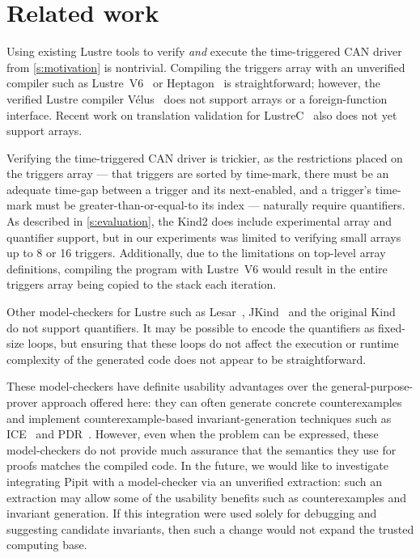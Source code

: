 
\section{Related work}
\label{s:related-work}


Using existing Lustre tools to verify \emph{and} execute the time-triggered CAN driver from \autoref{s:motivation} is nontrivial.
Compiling the triggers array with an unverified compiler such as Lustre~V6~\cite{jahier2016lustre} or Heptagon~\cite{gerard2012modular} is straightforward; however, the verified Lustre compiler Vélus~\cite{bourke2023verified} does not support arrays or a foreign-function interface.
Recent work on translation validation for LustreC~\cite{brun2023equation} also does not yet support arrays.

Verifying the time-triggered CAN driver is trickier, as the restrictions placed on the triggers array --- that triggers are sorted by time-mark, there must be an adequate time-gap between a trigger and its next-enabled, and a trigger's time-mark must be greater-than-or-equal-to its index --- naturally require quantifiers.
As described in \autoref{s:evaluation}, the Kind2 does include experimental array and quantifier support, but in our experiments was limited to verifying small arrays up to 8 or 16 triggers.
Additionally, due to the limitations on top-level array definitions, compiling the program with Lustre~V6 would result in the entire triggers array being copied to the stack each iteration.

Other model-checkers for Lustre such as Lesar~\cite{raymond2008synchronous}, JKind~\cite{gacek2018jkind} and the original Kind~\cite{hagen2008scaling} do not support quantifiers.
It may be possible to encode the quantifiers as fixed-size loops, but ensuring that these loops do not affect the execution or runtime complexity of the generated code does not appear to be straightforward.

These model-checkers have definite usability advantages over the general-purpose-prover approach offered here: they can often generate concrete counterexamples and implement counterexample-based invariant-generation techniques such as ICE~\cite{garg2014ice} and PDR~\cite{bradley2011sat,een2011efficient}.
However, even when the problem can be expressed, these model-checkers do not provide much assurance that the semantics they use for proofs matches the compiled code.
In the future, we would like to investigate integrating Pipit with a model-checker via an unverified extraction: such an extraction may allow some of the usability benefits such as counterexamples and invariant generation.
If this integration were used solely for debugging and suggesting candidate invariants, then such a change would not expand the trusted computing base.

